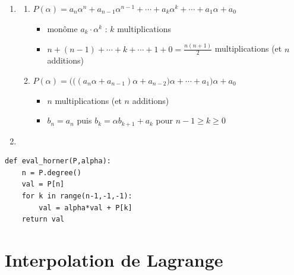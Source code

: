 \begin{frame}[fragile]
	\begin{enumerate}
  \item 
  \begin{enumerate}
    \item $P(\alpha) = a_n\alpha^n+a_{n-1}\alpha^{n-1}+\cdots +a_k\alpha^k+\cdots+a_1\alpha+a_0$
    
    \begin{itemize}
      \item monôme $a_k\cdot \alpha^ k$ :  $k$ multiplications
      \item $n+(n-1)+\cdots+k+\cdots+1+0 = \frac{n(n+1)}{2}$ multiplications (et $n$ additions)
    \end{itemize}
	
	 \pause
    
    \item $P(\alpha) =  \Big(\big((a_n \alpha+a_{n-1})\alpha +a_{n-2} \big) \alpha + \cdots + a_1\Big) \alpha +a_0$
    \begin{itemize}
      \item $n$ multiplications (et $n$ additions)
	
	 \pause      
      \item $b_{n} = a_n$ puis $b_{k} = \alpha b_{k+1}  + a_k$ pour $n-1\ge k \ge 0$
    \end{itemize}
     \pause
  \end{enumerate}    
    \item
\end{enumerate} 

  \begin{algo}
\begin{lstlisting}
def eval_horner(P,alpha):
    n = P.degree()
    val = P[n]
    for k in range(n-1,-1,-1):
        val = alpha*val + P[k]
    return val
\end{lstlisting}
\end{algo}

\end{frame}
 



\section{Interpolation de Lagrange}

